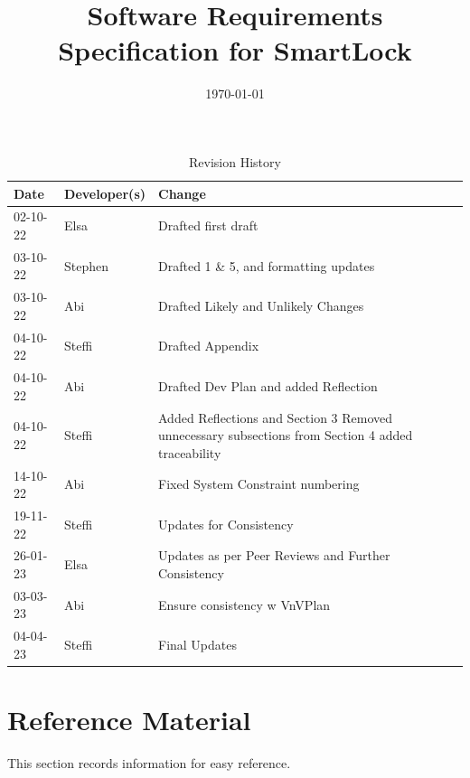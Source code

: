 \documentclass[12pt]{article}
\begin{document}
\title{Software Requirements Specification for SmartLock\\\progname} 
\author{\authname}
\date{\today}
	
\maketitle
\thispagestyle{empty}

\newpage
{}
\begin{table}[hp]
\caption{Revision History} \label{TblRevisionHistory}
\begin{tabularx}{\textwidth}{llX}
\toprule
\textbf{Date} & \textbf{Developer(s)} & \textbf{Change}\\
\midrule
02-10-22 & Elsa & Drafted first draft\\
03-10-22 & Stephen & Drafted 1 \& 5, and formatting updates\\
03-10-22 & Abi & Drafted Likely and Unlikely Changes\\
04-10-22 & Steffi & Drafted Appendix\\
04-10-22 & Abi & Drafted Dev Plan and added Reflection\\
04-10-22 & Steffi & Added Reflections and Section 3 Removed unnecessary subsections from Section 4 added traceability\\
14-10-22 & Abi & Fixed System Constraint numbering\\
19-11-22 & Steffi & Updates for Consistency\\
26-01-23 & Elsa & Updates as per Peer Reviews and Further Consistency\\
03-03-23 & Abi & Ensure consistency w VnVPlan\\
04-04-23 & Steffi & Final Updates\\
\bottomrule
\end{tabularx}
\end{table}

\newpage


\tableofcontents
\listoftables
\listoffigures

\newpage
{}
\section{Reference Material}

This section records information for easy reference.
\end{document}
